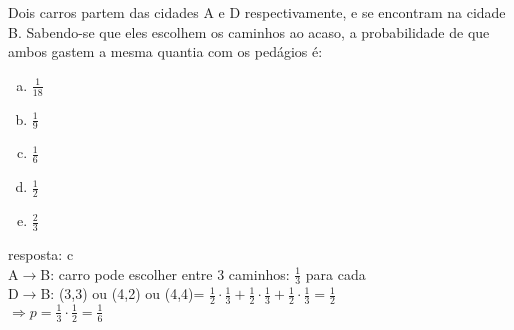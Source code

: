 \begin{ex}
Dois carros partem das cidades A e D respectivamente, e se encontram na cidade B. Sabendo-se que eles escolhem os caminhos ao acaso, a probabilidade de que ambos gastem a mesma quantia com os pedágios é:
    \begin{enumerate}[(a)]
    \item $\frac{1}{18}$
    \item $\frac{1}{9}$
    \item $\frac{1}{6}$
    \item $\frac{1}{2}$
    \item $\frac{2}{3}$
    \end{enumerate}
      \begin{sol}
        resposta: c \\
        A$\rightarrow$B: carro pode escolher entre 3 caminhos: $\frac{1}{3}$ para cada \\
        D$\rightarrow$B: (3,3) ou (4,2) ou (4,4)= $\frac{1}{2}\cdot\frac{1}{3}+\frac{1}{2}\cdot\frac{1}{3}+\frac{1}{2}\cdot\frac{1}{3}=\frac{1}{2}$\\
        $\Longrightarrow p=\frac{1}{3}\cdot\frac{1}{2}=\frac{1}{6}$
      \end{sol}
\end{ex}